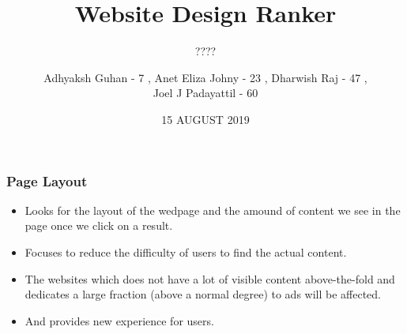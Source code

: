 \documentclass[11pt]{beamer}
\begin{document}
	\title{\textbf{Website Design Ranker}}
	\subtitle{????}
	\date{15 AUGUST 2019}
	\author{{\scriptsize Adhyaksh Guhan - 7 , Anet Eliza Johny - 23 , Dharwish Raj - 47 , \\ Joel J Padayattil - 60}}
	\begin{frame}[plain]
	\maketitle
\end{frame}
\begin{frame}
\frametitle{\textbf{Page Layout}}
\begin{itemize}
	\item Looks for the layout of the wedpage and the amound of content we see in the page once we click on a result.
	
	\item Focuses to reduce the difficulty of users to find the actual content.
	
	\item  The websites which does not have a lot of visible content above-the-fold and dedicates a large fraction (above a normal degree) to ads will be affected.
	
	\item And provides new experience for users.
\end{itemize}

\end{frame}
\end{document}
